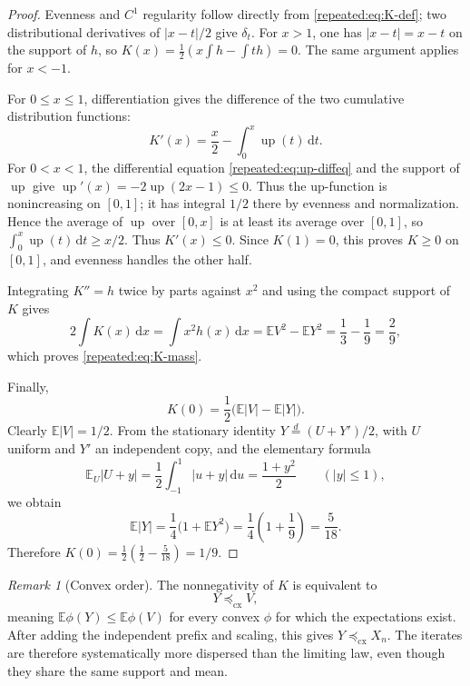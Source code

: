 \documentclass[11pt,oneside]{article}
\theoremstyle{definition}
\theoremstyle{remark}
\newtheorem{remark}[theorem]{Remark}
\newcommand{\Up}{\operatorname{up}}
\newcommand{\dd}{\,\mathrm d}
\newcommand{\E}{\mathbb E}
\begin{document}
\begin{proof}
Evenness and $C^1$ regularity follow directly from \eqref{repeated:eq:K-def}; two distributional
derivatives of $|x-t|/2$ give $\delta_t$.  For $x>1$, one has $|x-t|=x-t$ on the support of
$h$, so $K(x)=\tfrac12(x\int h-\int th)=0$.  The same argument applies for $x<-1$.

For $0\le x\le1$, differentiation gives the difference of the two cumulative distribution
functions:
\begin{equation}
 K'(x)=\frac{x}{2}-\int_0^x\Up(t)\dd t.                    \label{repeated:eq:K-prime}
\end{equation}
For $0<x<1$, the differential equation \eqref{repeated:eq:up-diffeq} and the support of $\Up$ give
$\Up'(x)=-2\Up(2x-1)\le0$.  Thus the up-function is nonincreasing on $[0,1]$; it
has integral $1/2$ there by evenness and normalization.  Hence the average of $\Up$ over
$[0,x]$ is at least its average over $[0,1]$, so
$\int_0^x\Up(t)\dd t\ge x/2$.  Thus $K'(x)\le0$.  Since $K(1)=0$, this proves $K\ge0$ on
$[0,1]$, and evenness handles the other half.

Integrating $K''=h$ twice by parts against $x^2$ and using the compact support of $K$ gives
\[
 2\int K(x)\dd x=\int x^2h(x)\dd x
 =\E V^2-\E Y^2=\frac13-\frac19=\frac29,
\]
which proves \eqref{repeated:eq:K-mass}.

Finally,
\[
 K(0)=\frac12\bigl(\E|V|-\E|Y|\bigr).
\]
Clearly $\E|V|=1/2$.  From the stationary identity
$Y\overset d=(U+Y')/2$, with $U$ uniform and $Y'$ an independent copy, and the elementary
formula
\[
 \E_U|U+y|=\frac12\int_{-1}^{1}|u+y|\dd u=\frac{1+y^2}{2}
 \qquad(|y|\le1),
\]
we obtain
\[
 \E|Y|=\frac14\bigl(1+\E Y^2\bigr)=\frac14\left(1+\frac19\right)=\frac5{18}.
\]
Therefore $K(0)=\tfrac12(\tfrac12-\tfrac5{18})=1/9$.
\end{proof}

\begin{remark}[Convex order]
The nonnegativity of $K$ is equivalent to
\begin{equation}
 Y\preceq_{\mathrm{cx}}V,                                  \label{repeated:eq:convex-order}
\end{equation}
meaning $\E\phi(Y)\le\E\phi(V)$ for every convex $\phi$ for which the expectations exist.
After adding the independent prefix and scaling, this gives
$Y\preceq_{\mathrm{cx}}X_n$.  The iterates are therefore systematically more dispersed than
the limiting law, even though they share the same support and mean.
\end{remark}
\end{document}
